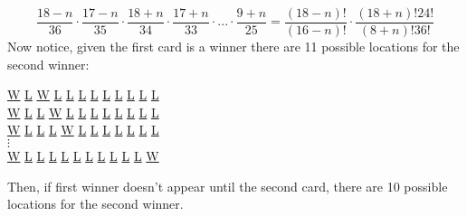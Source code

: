 \documentclass[11pt]{article}
\begin{document}
\begin {equation}
\frac{18-n}{36}\cdot \frac{17-n}{35}\cdot \frac{18+n}{34} \cdot \frac{17+n}{33}\cdot ...\cdot \frac {9+n}{25}=\frac{(18-n)!}{(16-n)!}\cdot \frac{(18+n)!24!}{(8+n)!36!}
\end{equation}
Now notice, given the first card is a winner there are 11 possible locations for the second winner:
\begin {center}
  \underline{W} \underline{L} \underline{W} \underline{L} \underline{L} \underline{L} \underline{L} \underline{L} \underline{L} \underline{L} \underline{L} \underline{L}\\
  \underline{W} \underline{L} \underline{L} \underline{W} \underline{L} \underline{L} \underline{L} \underline{L} \underline{L} \underline{L} \underline{L} \underline{L}\\
  \underline{W} \underline{L} \underline{L} \underline{L} \underline{W} \underline{L} \underline{L} \underline{L} \underline{L} \underline{L} \underline{L} \underline{L}\\
 $\vdots$ \\
   \underline{W} \underline{L} \underline{L} \underline{L} \underline{L} \underline{L} \underline{L} \underline{L} \underline{L} \underline{L} \underline{L} \underline{W}\\
\end {center}
Then, if first winner doesn't appear until the second card, there are 10 possible locations for the second winner. 
\end{document}

